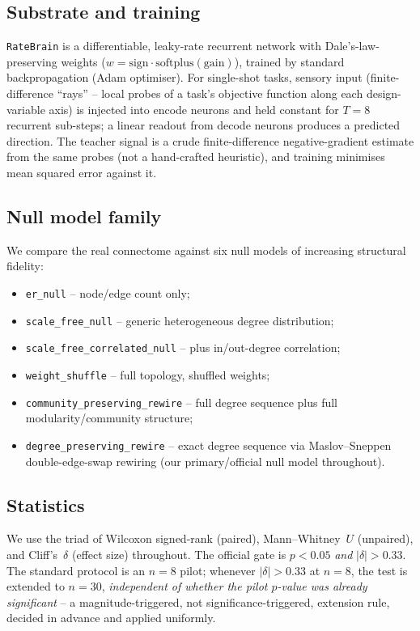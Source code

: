 \documentclass[11pt]{article}
\begin{document}
\subsection{Substrate and training}

\texttt{RateBrain} is a differentiable, leaky-rate recurrent network
with Dale's-law-preserving weights ($w = \mathrm{sign} \cdot
\mathrm{softplus}(\mathrm{gain})$), trained by standard backpropagation
(Adam optimiser). For single-shot tasks, sensory input (finite-difference
``rays'' -- local probes of a task's objective function along each
design-variable axis) is injected into encode neurons and held constant
for $T{=}8$ recurrent sub-steps; a linear readout from decode neurons
produces a predicted direction. The teacher signal is a crude
finite-difference negative-gradient estimate from the same probes (not a
hand-crafted heuristic), and training minimises mean squared error
against it.

\subsection{Null model family}

We compare the real connectome against six null models of increasing
structural fidelity:
\begin{itemize}
  \item \texttt{er\_null} -- node/edge count only;
  \item \texttt{scale\_free\_null} -- generic heterogeneous degree distribution;
  \item \texttt{scale\_free\_correlated\_null} -- plus in/out-degree correlation;
  \item \texttt{weight\_shuffle} -- full topology, shuffled weights;
  \item \texttt{community\_preserving\_rewire} -- full degree sequence plus full modularity/community structure;
  \item \texttt{degree\_preserving\_rewire} -- exact degree sequence via Maslov--Sneppen double-edge-swap rewiring (our primary/official null model throughout).
\end{itemize}

\subsection{Statistics}

We use the triad of Wilcoxon signed-rank (paired), Mann--Whitney~$U$
(unpaired), and Cliff's~$\delta$ (effect size) throughout. The official
gate is $p<0.05$ \emph{and} $|\delta|>0.33$. The standard protocol is an
$n=8$ pilot; whenever $|\delta|>0.33$ at $n=8$, the test is extended to
$n=30$, \emph{independent of whether the pilot $p$-value was already
significant} -- a magnitude-triggered, not significance-triggered,
extension rule, decided in advance and applied uniformly.
\end{document}
